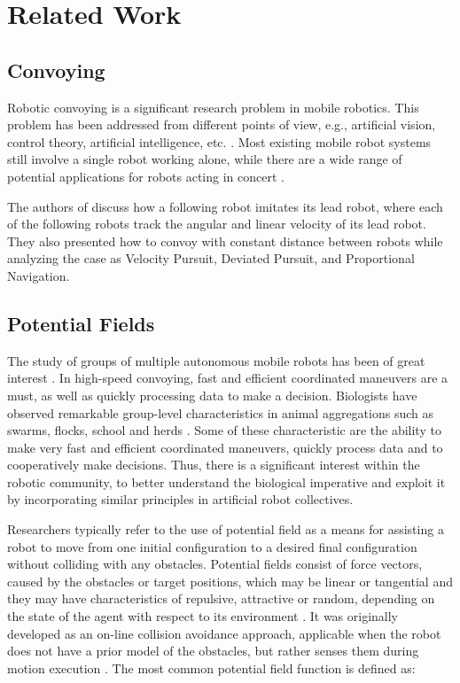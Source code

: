 \chapter{Related Work}
\section{Convoying}
Robotic convoying is a significant research problem in mobile robotics. This problem has been addressed from different points of view, e.g., artificial vision, control theory, artificial intelligence, etc. \cite{article:convoy_comm}. Most existing mobile robot systems still involve a single robot working alone, while there are a wide range of potential applications for robots acting in concert \cite{article:convoy_comm}.

The authors of \cite{article:guidance_control} discuss how a following robot imitates its lead robot, where each of the following robots track the angular and linear velocity of its lead robot. They also presented how to convoy with constant distance between robots while analyzing the case as Velocity Pursuit, Deviated Pursuit, and Proportional Navigation.

\section{Potential Fields}
The study of groups of multiple autonomous mobile robots has been of great interest \cite{article:motion_planning_apf}. In high-speed convoying, fast and efficient coordinated maneuvers are a must, as well as quickly processing data to make a decision. Biologists have observed remarkable group-level characteristics in animal aggregations such as swarms, flocks, school and herds \cite{article:motion_planning_apf}. Some of these characteristic are the ability to make very fast and efficient coordinated maneuvers, quickly process data and to cooperatively make decisions. Thus, there is a significant interest within the robotic community, to better understand the biological imperative and exploit it by incorporating similar principles in artificial robot collectives.  

Researchers typically refer to the use of potential field as a means for assisting a robot to move from one initial configuration to a desired final configuration without colliding with any obstacles. Potential fields consist of force vectors, caused by the obstacles or target positions, which may be linear or tangential and they may have characteristics of repulsive, attractive or random, depending on the state of the agent with respect to its environment \cite{article:apf}. It was originally developed as an on-line collision avoidance approach, applicable when the robot does not have a prior model of the obstacles, but rather senses them during motion execution \cite{article:real_time_avoidance_manip}. The most common potential field function is defined as:

